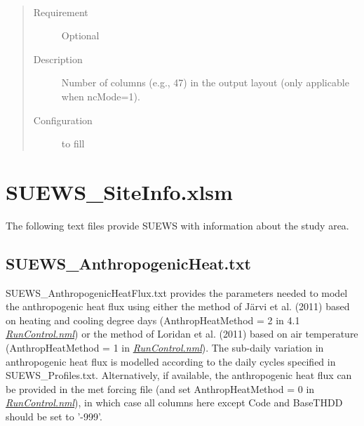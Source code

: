 \documentclass[letterpaper,10pt,english]{sphinxmanual}
\begin{document}

\begin{fulllineitems}
\label{\detokenize{input_files/RunControl/netCDF_related_options:cmdoption-arg-ncol}}~\begin{quote}\begin{description}
\item[{Requirement}] \leavevmode
Optional

\item[{Description}] \leavevmode
Number of columns (e.g., 47) in the output layout (only applicable when ncMode=1).

\item[{Configuration}] \leavevmode
to fill

\end{description}\end{quote}

\end{fulllineitems}



\section{SUEWS\_SiteInfo.xlsm}
\label{\detokenize{input_files/SUEWS_SiteInfo/SUEWS_SiteInfo::doc}}\label{\detokenize{input_files/SUEWS_SiteInfo/SUEWS_SiteInfo:suews-siteinfo-xlsm}}
The following text files provide SUEWS with information about the study
area.


\subsection{SUEWS\_AnthropogenicHeat.txt}
\label{\detokenize{input_files/SUEWS_SiteInfo/SUEWS_AnthropogenicHeat::doc}}\label{\detokenize{input_files/SUEWS_SiteInfo/SUEWS_AnthropogenicHeat:suews-anthropogenicheat-txt}}
SUEWS\_AnthropogenicHeatFlux.txt provides the parameters needed to model
the anthropogenic heat flux using either the method of Järvi et al.
(2011) based on heating and cooling degree days (AnthropHeatMethod = 2
in 4.1 {\hyperref[\detokenize{input_files/SUEWS_SiteInfo/SUEWS_AnthropogenicHeat:RunControl.nml}]{\emph{RunControl.nml}}}) or the method of Loridan et
al. (2011) based on air temperature (AnthropHeatMethod = 1 in
{\hyperref[\detokenize{input_files/SUEWS_SiteInfo/SUEWS_AnthropogenicHeat:RunControl.nml}]{\emph{RunControl.nml}}}). The sub-daily variation in
anthropogenic heat flux is modelled according to the daily cycles
specified in SUEWS\_Profiles.txt. Alternatively, if available, the
anthropogenic heat flux can be provided in the met forcing file (and set
AnthropHeatMethod = 0 in {\hyperref[\detokenize{input_files/SUEWS_SiteInfo/SUEWS_AnthropogenicHeat:RunControl.nml}]{\emph{RunControl.nml}}}), in which
case all columns here except Code and BaseTHDD should be set to ’-999’.
\end{document}
